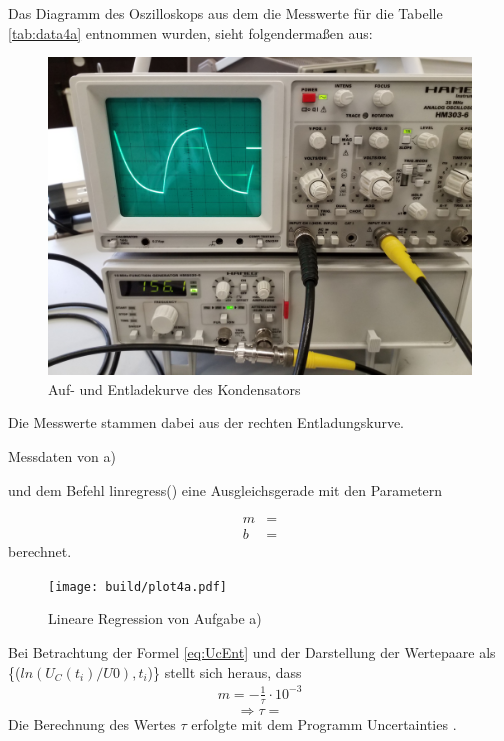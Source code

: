   Das Diagramm des Oszilloskops aus dem die Messwerte für die Tabelle \ref{tab:data4a} entnommen 
  wurden, sieht folgendermaßen aus:
  \begin{figure}[H]
    \includegraphics[width=\textwidth]{images/4a.jpg}
    \centering
    \caption{Auf- und Entladekurve des Kondensators}
    \label{fig:4ajpg}
  \end{figure}
  Die Messwerte stammen dabei aus der rechten Entladungskurve.
  \begin{table}[H]
        \centering
        \caption{Messdaten von a)}
         
        \label{tab:data4a}
  \end{table}

   \cite{scipy} und dem Befehl linregress() eine
  Ausgleichsgerade mit den Parametern

  \begin{align*}
    m &= \text{}\\
    b &= \text{}
  \end{align*}
  berechnet.
  
  \begin{figure}[H]
    \texttt{[image: build/plot4a.pdf]}
    \centering
    \caption{Lineare Regression von Aufgabe a)}
    \label{fig:4a}
  \end{figure}
  Bei Betrachtung der Formel \eqref{eq:UcEnt} und der Darstellung der Wertepaare als 
  \{($ln(U_C(t_i)/U0),t_i$)\} stellt sich heraus, dass
  \begin{align*}
    m = -\frac{1}{\tau} \cdot 10^{-3}
  \end{align*}
  \begin{equation}
   \Rightarrow \tau = \text{}
  \end{equation}
  Die Berechnung des Wertes $\tau$ erfolgte mit dem Programm Uncertainties \cite{uncertainties}.



